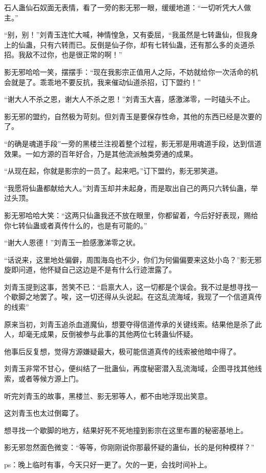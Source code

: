 \begin{this_body}
石人蛊仙石奴面无表情，看了一旁的影无邪一眼，缓缓地道：“一切听凭大人做主。”

“别，别！”刘青玉连忙大喊，神情惶急，又有委屈，“我虽然是七转蛊仙，但我身上的仙蛊，只有六转而已。反倒是仙子你，却有七转仙蛊，还有那么多的炎道杀招。我敌不过你，也是很正常的啊！”

影无邪哈哈一笑，摆摆手：“现在我影宗正值用人之际，不妨就给你一次活命的机会就是了。乖乖地不要反抗，我来催动仙道杀招，订下盟约！”

“谢大人不杀之恩，谢大人不杀之恩！”刘青玉大喜，感激涕零，一时磕头不止。

影无邪的盟约，自然极为苛刻。但刘青玉是要保存性命，其他的东西已经是次要的了。

“的确是魂道手段”一旁的黑楼兰注视着整个过程，影无邪是用魂道手段，达到信道效果。一如方源的百年好合，乃是其他流派触类旁通的成果。

“从现在起，你就是影宗的一员了。起来吧。”订下盟约，影无邪笑道。

“我愿将仙蛊都献给大人。”刘青玉却并未起身，而是取出自己的两只六转仙蛊，举过头顶。

影无邪哈哈大笑：“这两只仙蛊我还不放在眼里，你都留着，今后好好表现，赐给你七转仙蛊或者真传什么的，也是有可能的。”

“谢大人恩德！”刘青玉一脸感激涕零之状。

“话说来，这里地处偏僻，周围海岛也不少，你们为何偏偏要来这处小岛？”影无邪旋即问道，他怀疑自己这边是不是有什么行迹泄露了。

刘青玉提到这事，苦笑不已：“启禀大人，这一切都是个误会。我不过是想寻找一个歇脚之地罢了。唉，这一切还得从头说起。在这乱流海域，我现了一个信道真传的线索”

原来当初，刘青玉追杀血道魔仙，想要夺得信道传承的关键线索。结果他是杀了此人，却毫无成果，反倒被参与此事的其他两位七转蛊仙怀疑。

他事后反复想，觉得方源嫌疑最大，极可能信道真传的线索被他暗中得了。

刘青玉非常不甘心，便纠结了一批蛊仙，再度秘密潜入乱流海域，企图寻找其他线索，或者等候方源上门。

听完刘青玉的故事，黑楼兰、影无邪等人，都不由地浮现出笑意。

这刘青玉也太过倒霉了。

想寻找一个歇脚的地方，结果好死不死地撞到影宗在这里布置的秘密基地上。

影无邪忽然面色微变：“等等，你刚刚说你那最怀疑的蛊仙，长的是何种模样？”

ps：晚上临时有事，今天只好一更了。欠的一更，会找时间补上。

\end{this_body}

